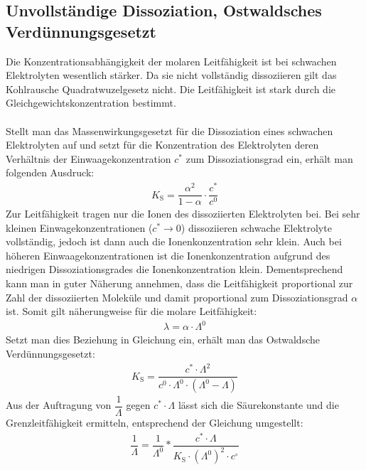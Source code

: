 \documentclass[12pt,a4paper,titlepage,headinclude,bibtotoc]{scrartcl}
\begin{document}
\subsection{Unvollständige Dissoziation, Ostwaldsches Verdünnungsgesetzt}
Die Konzentrationsabhängigkeit der molaren Leitfähigkeit ist bei schwachen Elektrolyten wesentlich stärker. Da sie nicht vollständig dissoziieren gilt das Kohlrausche Quadratwuzelgesetz nicht. Die Leitfähigkeit ist stark durch die Gleichgewichtskonzentration bestimmt.\\\\
Stellt man das Massenwirkungsgesetzt für die Dissoziation eines schwachen Elektrolyten auf und setzt für die Konzentration des Elektrolyten deren Verhältnis der Einwaagekonzentration $c^*$ zum Dissoziationsgrad ein, erhält man folgenden Ausdruck:
\begin{align}
K_\mathrm{S} = \dfrac{\alpha ^2}{1-\alpha } \cdot \dfrac{c^*}{c^0}
\end{align}
Zur Leitfähigkeit tragen nur die Ionen des dissoziierten Elektrolyten bei. Bei sehr kleinen Einwagekonzentrationen ($c^* \rightarrow 0$) dissoziieren schwache Elektrolyte vollständig, jedoch ist dann auch die Ionenkonzentration sehr klein. Auch bei höheren Einwaagekonzentrationen ist die Ionenkonzentration aufgrund des niedrigen Dissoziationsgrades die Ionenkonzentration klein. Dementsprechend kann man in guter Näherung annehmen, dass die Leitfähigkeit proportional zur Zahl der dissoziierten Moleküle und damit proportional zum Dissoziationsgrad $\alpha$ ist. Somit gilt näherungweise für die molare Leitfähigkeit:
\begin{align}
\lambda = \alpha \cdot \Lambda ^0 
\end{align}    
Setzt man dies Beziehung in Gleichung ein, erhält man das Ostwaldsche Verdünnungsgesetzt:
\begin{align}
K_\mathrm{S} = \dfrac{c^* \cdot \Lambda ^2}{c^0 \cdot \Lambda ^0 \cdot (\Lambda ^0 - \Lambda)}
\end{align} 
 Aus der Auftragung von $\dfrac{1}{\Lambda}$ gegen $c^* \cdot \Lambda$ lässt sich die Säurekonstante und die Grenzleitfähigkeit ermitteln, entsprechend der Gleichung umgestellt:
\begin{align}
\dfrac{1}{\Lambda} = \dfrac{1}{\Lambda ^0} * \dfrac{c^* \cdot \Lambda }{K_\mathrm{S} \cdot (\Lambda ^0)^2 \cdot c^\circ}
\end{align}

\newpage
\end{document}

